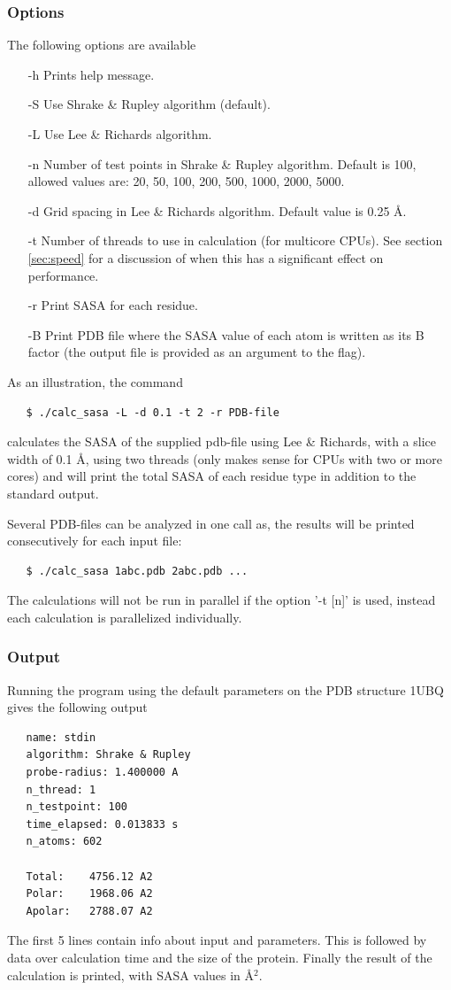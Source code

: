 \documentclass[a4paper,11pt]{article}
\begin{document}
\subsubsection{Options}
The following options are available
\begin{itemize}
  \item[-h] Prints help message.
  \item[-S] Use Shrake \& Rupley algorithm (default).
  \item[-L] Use Lee \& Richards algorithm.
  \item[-n] Number of test points in Shrake \& Rupley algorithm.
    Default is 100, allowed values are: 20, 50, 100, 200, 500, 1000,
    2000, 5000.
  \item[-d] Grid spacing in Lee \& Richards algorithm.
  Default value is 0.25 Å.
  \item[-t] Number of threads to use in calculation (for multicore
    CPUs). See section \ref{sec:speed} for a discussion of when this
    has a significant effect on performance.
  \item[-r] Print SASA for each residue.
  \item[-B] Print PDB file where the SASA value of each atom is
    written as its B factor (the output file is provided as an
    argument to the flag).
\end{itemize}
As an illustration, the command
\begin{verbatim}
   $ ./calc_sasa -L -d 0.1 -t 2 -r PDB-file
\end{verbatim}
calculates the SASA of the supplied pdb-file using Lee \& Richards,
with a slice width of 0.1 Å, using two threads (only makes sense for
CPUs with two or more cores) and will print the total SASA of each
residue type in addition to the standard output.

Several PDB-files can be analyzed in one call as, the results will be
printed consecutively for each input file:
\begin{verbatim}
   $ ./calc_sasa 1abc.pdb 2abc.pdb ...
\end{verbatim}
The calculations will not be run in parallel if the option '-t [n]' is
used, instead each calculation is parallelized individually.

\subsubsection{Output}
Running the program using the default parameters on the PDB structure
1UBQ gives the following output
\begin{verbatim}
   name: stdin
   algorithm: Shrake & Rupley
   probe-radius: 1.400000 A
   n_thread: 1
   n_testpoint: 100
   time_elapsed: 0.013833 s
   n_atoms: 602
   
   Total:    4756.12 A2
   Polar:    1968.06 A2
   Apolar:   2788.07 A2
\end{verbatim}
The first 5 lines contain info about input and parameters. This is
followed by data over calculation time and the size of the
protein. Finally the result of the calculation is printed, with SASA
values in Å$^2$.
\end{document}
